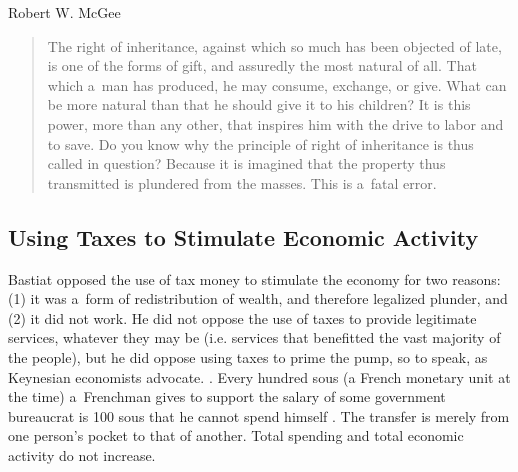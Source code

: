\begin{artengenv}{Robert W. McGee}
\begin{quote}
The right of inheritance, against which so much has been objected of late, is one of the forms of gift, and assuredly the most natural of all. That which a~man has produced, he may consume, exchange, or give. What can be more natural than that he should give it to his children? It is this power, more than any other, that inspires him with the drive to labor and to save. Do you know why the principle of right of inheritance is thus called in question? Because it is imagined that the property thus transmitted is plundered from the masses. This is a~fatal error. 
\parencite[][p.142]{bastiat_bastiat_2007}%
\end{quote}




\subsection{Using Taxes to Stimulate Economic Activity }



Bastiat opposed the use of tax money to stimulate the economy for two reasons: (1) it was a~form of redistribution of wealth, and therefore legalized plunder, and (2) it did not work. He did not oppose the use of taxes to provide legitimate services, whatever they may be (i.e. services that benefitted the vast majority of the people), but he did oppose using taxes to prime the pump, so to speak, as Keynesian economists advocate. 
\parencite[][pp.8–9, 16]{bastiat_selected_1964}. %
 Every hundred sous (a French monetary unit at the time) a~Frenchman gives to support the salary of some government bureaucrat is 100 sous that he cannot spend himself 
\parencite[][p.8]{bastiat_selected_1964}. %
 The transfer is merely from one person's pocket to that of another. Total spending and total economic activity do not increase.




\end{artengenv}
